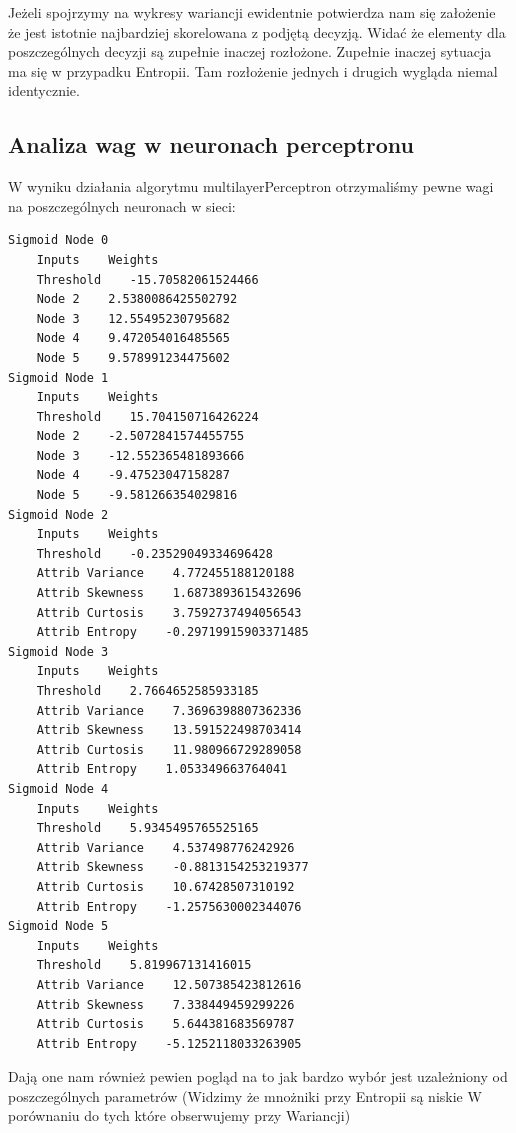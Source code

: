 \documentclass{classrep}
\begin{document}
Jeżeli spojrzymy na wykresy wariancji ewidentnie potwierdza nam się założenie że jest istotnie najbardziej skorelowana z podjętą decyzją. Widać że elementy dla poszczególnych decyzji są zupełnie inaczej rozłożone. Zupełnie inaczej sytuacja ma się w przypadku Entropii. Tam rozłożenie jednych i drugich wygląda niemal identycznie.

\subsection{Analiza wag w neuronach perceptronu}
W wyniku działania algorytmu multilayerPerceptron otrzymaliśmy pewne wagi na poszczególnych neuronach w sieci:

\scriptsize
\begin{verbatim}
Sigmoid Node 0
    Inputs    Weights
    Threshold    -15.70582061524466
    Node 2    2.5380086425502792
    Node 3    12.55495230795682
    Node 4    9.472054016485565
    Node 5    9.578991234475602
Sigmoid Node 1
    Inputs    Weights
    Threshold    15.704150716426224
    Node 2    -2.5072841574455755
    Node 3    -12.552365481893666
    Node 4    -9.47523047158287
    Node 5    -9.581266354029816
Sigmoid Node 2
    Inputs    Weights
    Threshold    -0.23529049334696428
    Attrib Variance    4.772455188120188
    Attrib Skewness    1.6873893615432696
    Attrib Curtosis    3.7592737494056543
    Attrib Entropy    -0.29719915903371485
Sigmoid Node 3
    Inputs    Weights
    Threshold    2.7664652585933185
    Attrib Variance    7.3696398807362336
    Attrib Skewness    13.591522498703414
    Attrib Curtosis    11.980966729289058
    Attrib Entropy    1.053349663764041
Sigmoid Node 4
    Inputs    Weights
    Threshold    5.9345495765525165
    Attrib Variance    4.537498776242926
    Attrib Skewness    -0.8813154253219377
    Attrib Curtosis    10.67428507310192
    Attrib Entropy    -1.2575630002344076
Sigmoid Node 5
    Inputs    Weights
    Threshold    5.819967131416015
    Attrib Variance    12.507385423812616
    Attrib Skewness    7.338449459299226
    Attrib Curtosis    5.644381683569787
    Attrib Entropy    -5.1252118033263905
\end{verbatim}
\normalsize

Dają one nam również pewien pogląd na to jak bardzo wybór jest uzależniony od poszczególnych parametrów (Widzimy że mnożniki przy Entropii są niskie W porównaniu do tych które obserwujemy przy Wariancji)
\end{document}
